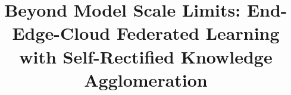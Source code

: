 \documentclass[10pt,journal]{IEEEtran}
\begin{document}
%


\title{
Beyond Model Scale Limits: End-Edge-Cloud Federated Learning with Self-Rectified Knowledge Agglomeration}
%
%
%
%
\end{document}
